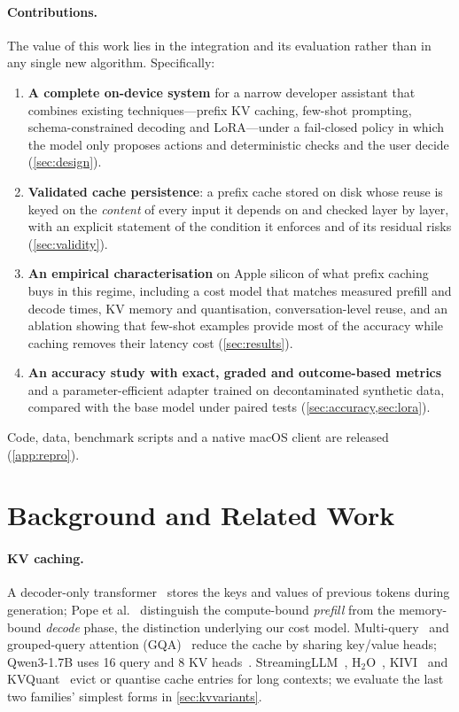 \documentclass[10pt,twocolumn,letterpaper]{article}
\theoremstyle{definition}
\begin{document}
\paragraph{Contributions.} The value of this work lies in the integration and its evaluation rather
than in any single new algorithm. Specifically:
\begin{enumerate}
\item \textbf{A complete on-device system} for a narrow developer assistant that combines existing
  techniques---prefix KV caching, few-shot prompting, schema-constrained decoding and LoRA---under a
  fail-closed policy in which the model only proposes actions and deterministic checks and the user
  decide (\cref{sec:design}).
\item \textbf{Validated cache persistence}: a prefix cache stored on disk whose reuse is keyed on the
  \emph{content} of every input it depends on and checked layer by layer, with an explicit statement
  of the condition it enforces and of its residual risks (\cref{sec:validity}).
\item \textbf{An empirical characterisation} on Apple silicon of what prefix caching buys in this
  regime, including a cost model that matches measured prefill and decode times, KV memory and
  quantisation, conversation-level reuse, and an ablation showing that few-shot examples provide most
  of the accuracy while caching removes their latency cost (\cref{sec:results}).
\item \textbf{An accuracy study with exact, graded and outcome-based metrics} and a parameter-efficient
  adapter trained on decontaminated synthetic data, compared with the base model under paired tests
  (\cref{sec:accuracy,sec:lora}).
\end{enumerate}
Code, data, benchmark scripts and a native macOS client are released (\cref{app:repro}).

\section{Background and Related Work}\label{sec:related}

\paragraph{KV caching.}
A decoder-only transformer~\cite{vaswani2017attention} stores the keys and values of previous tokens
during generation; Pope et al.~\cite{pope2023efficiently} distinguish the compute-bound
\emph{prefill} from the memory-bound \emph{decode} phase, the distinction underlying our cost model.
Multi-query~\cite{shazeer2019fast} and grouped-query attention (GQA)~\cite{ainslie2023gqa} reduce the
cache by sharing key/value heads; Qwen3-1.7B uses 16 query and 8 KV heads~\cite{yang2025qwen3}.
StreamingLLM~\cite{xiao2024streamingllm}, H$_2$O~\cite{zhang2023h2o}, KIVI~\cite{liu2024kivi} and
KVQuant~\cite{hooper2024kvquant} evict or quantise cache entries for long contexts; we evaluate the
last two families' simplest forms in \cref{sec:kvvariants}.
\end{document}
